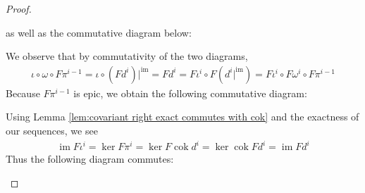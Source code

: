 \documentclass{article}
\DeclareMathOperator{\im}{\mathrm{im}}
\DeclareMathOperator{\cok}{\mathrm{cok}}
\begin{document}
\begin{proof}
\begin{enumerate}[(a)]
\begin{center}
   \end{center}
   as well as the commutative diagram below:
   \begin{center}
   \end{center}
   We observe that by commutativity of the two diagrams,
   \begin{align*}
       \iota \circ \omega \circ F\pi^{i-1}=\iota \circ (Fd^i)\vert^{\im}=Fd^i=F\iota^i\circ F(d^i\vert^{\im})=F\iota^i\circ F\omega^i\circ F\pi^{i-1}
   \end{align*}
   Because $F\pi^{i-1}$ is epic, we obtain the following commutative diagram:
   \begin{center}
   \end{center}
   Using Lemma \ref{lem:covariant right exact commutes with cok} and the exactness of our sequences, we see
\begin{align*}
    \im F\iota^i=\ker F\pi^i=\ker F\cok d^i=\ker \cok F d^i=\im Fd^i
\end{align*}
   Thus the following diagram commutes:
   \begin{center}
\end{center}
\end{enumerate}
\end{proof}
\end{document}
